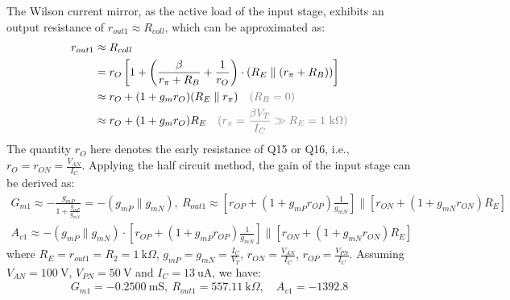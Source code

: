 \documentclass[UTF8]{article}
\begin{document}
The Wilson current mirror, as the active load of the input stage, exhibits an output resistance of $r_{out1} \approx R_{coll}$, which can be approximated as:
\begin{align}
    r_{out1} &\approx R_{coll} 
    \\
    &= r_O \left[1 + \left(\frac{\beta}{r_{\pi} + R_B} + \frac{1}{r_O}\right)\cdot \left(R_E \parallel (r_{\pi} + R_B)\right)\right] 
    \\ 
    &\approx r_O + (1 + g_m r_O) (R_E \parallel r_{\pi})\quad {\color{gray} (R_B = 0)}
    \\ 
    &\approx r_O + (1 + g_m r_O)R_E \quad {\color{gray} (r_{\pi} = \frac{\beta V_T}{I_C} \gg R_E = 1\ \mathrm{k}\Omega)}
\end{align}
The quantity $r_O$ here denotes the early resistance of Q15 or Q16, i.e., $r_O = r_{ON} = \frac{V_{AN}}{I_C}$. Applying the half circuit method, the gain of the input stage can be derived as:
\begin{gather}
G_{m1} \approx - \frac{g_{mP}}{1 + \frac{g_{mP}}{g_{mN}}} = - (g_{mP} \parallel g_{mN}),\ 
R_{out1} \approx \left[ r_{OP} + (1 + g_{mP}r_{OP})\frac{1}{g_{mN}} \right] \parallel \left[r_{ON} + (1 + g_{mN} r_{ON})R_E\right]
\\ 
A_{v1} \approx -(g_{mP} \parallel g_{mN}) \cdot \left[ r_{OP} + (1 + g_{mP}r_{OP})\frac{1}{g_{mN}} \right] \parallel \left[r_{ON} + (1 + g_{mN} r_{ON})R_E\right]
\end{gather}
where $R_E = r_{out1} = R_2 = 1\ \mathrm{k}\Omega$, $g_{mP} = g_{mN} = \frac{I_C}{V_T}$, $r_{ON} = \frac{V_{AN}}{I_C}$, $r_{OP} = \frac{V_{PN}}{I_C}$. Assuming $V_{AN} = 100 \ \mathrm{V}$, $V_{PN} = 50 \ \mathrm{V}$ and $I_C = 13 \ \mathrm{uA}$, we have:
\begin{gather}
G_{m1} = - 0.2500 \ \mathrm{mS},\ R_{out1} = 557.11 \ \mathrm{k}\Omega,\quad 
A_{v1} = -1392.8
\end{gather}
\end{document}
